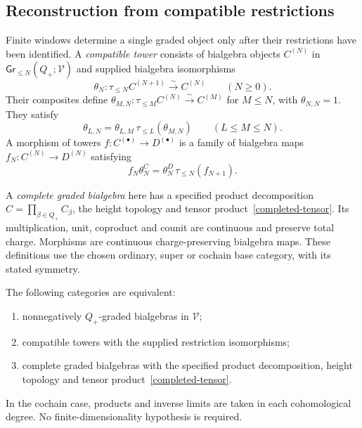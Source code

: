 \subsection{Reconstruction from compatible restrictions}

Finite windows determine a single graded object only after their
restrictions have been identified.  A \emph{compatible tower} consists
of bialgebra objects $C^{(N)}$ in
$\mathsf{Gr}_{\leq N}(Q_+;\mathcal V)$ and supplied bialgebra
isomorphisms
\[
 \theta_N:\tau_{\leq N}C^{(N+1)}\xrightarrow{\sim}C^{(N)}
 \qquad(N\geq0).
\]
Their composites define
$\theta_{M,N}:\tau_{\leq M}C^{(N)}\xrightarrow{\sim}C^{(M)}$
for $M\leq N$, with $\theta_{N,N}=1$.
They satisfy
\[
 \theta_{L,N}=\theta_{L,M}\,\tau_{\leq L}(\theta_{M,N})
 \qquad(L\leq M\leq N).
\]
A morphism of towers $f:C^{(\bullet)}\to D^{(\bullet)}$ is a family
of bialgebra maps $f_N:C^{(N)}\to D^{(N)}$ satisfying
\begin{equation}
 f_N\theta_N^C=\theta_N^D\,\tau_{\leq N}(f_{N+1}).
 \label{tower-morphism}
\end{equation}

A \emph{complete graded bialgebra} here has a specified product
decomposition $\widehat C=\prod_{\beta\in Q_+}C_\beta$, the height
topology and tensor product~\eqref{completed-tensor}.
Its multiplication, unit, coproduct and counit are continuous and
preserve total charge.  Morphisms are continuous charge-preserving
bialgebra maps.  These definitions use the chosen ordinary, super or
cochain base category, with its stated symmetry.

\begin{theorem}\label{tower-theorem}
The following categories are equivalent:
\begin{enumerate}
\item nonnegatively $Q_+$-graded bialgebras in $\mathcal V$;
\item compatible towers with the supplied restriction isomorphisms;
\item complete graded bialgebras with the specified product decomposition,
height topology and tensor product~\eqref{completed-tensor}.
\end{enumerate}
In the cochain case, products and inverse limits are taken in each
cohomological degree.  No finite-dimensionality hypothesis is required.
\end{theorem}

